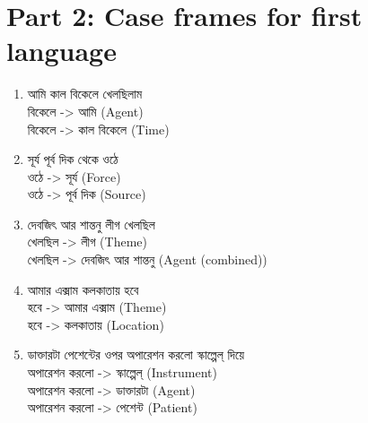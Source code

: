 \documentclass[11pt,a4paper,twocolumn]{article}
\begin{document}
	\section{Part 2: Case frames for first language}
	{\bg
	\begin{enumerate}
		
		\item আমি কাল বিকেলে খেলছিলাম\\
		\textcolor{hlit}{বিকেলে} -> \textcolor{rlit}{আমি} (Agent)\\
		\textcolor{hlit}{বিকেলে} -> \textcolor{rlit}{কাল বিকেলে} (Time)\\
				
		
		\item সূর্য পূর্ব দিক থেকে ওঠে \\
		\textcolor{hlit}{ওঠে} -> \textcolor{rlit}{সূর্য} (Force)\\
		\textcolor{hlit}{ওঠে} -> \textcolor{rlit}{পূর্ব দিক} (Source)\\
				
		\item দেবজিৎ আর শান্তনু লীগ খেলছিল \\
		\textcolor{hlit}{খেলছিল} -> \textcolor{rlit}{লীগ} (Theme)\\
		\textcolor{hlit}{খেলছিল} -> \textcolor{rlit}{দেবজিৎ আর শান্তনু} (Agent (combined))\\
				
		\item আমার এক্সাম কলকাতায় হবে \\
		\textcolor{hlit}{হবে} -> \textcolor{rlit}{আমার এক্সাম} (Theme)\\
		\textcolor{hlit}{হবে } -> \textcolor{rlit}{কলকাতায়} (Location)\\
				
		\item ডাক্তারটা পেশেন্টের ওপর অপারেশন করলো স্কাল্পেল্ দিয়ে \\
		\textcolor{hlit}{অপারেশন করলো} -> \textcolor{rlit}{স্কাল্পেল্} (Instrument)\\
		\textcolor{hlit}{অপারেশন করলো} -> \textcolor{rlit}{ডাক্তারটা} (Agent)\\
		\textcolor{hlit}{অপারেশন করলো} -> \textcolor{rlit}{পেশেন্ট} (Patient)\\
				
	\end{enumerate}		
	}	
	
\end{document}
